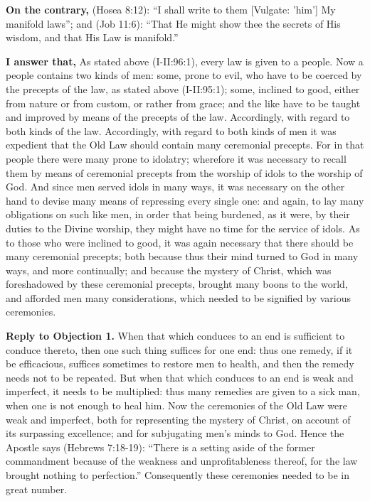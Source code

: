 \textbf{On the contrary,} (Hosea 8:12): ``I shall write to them [Vulgate: 'him'] My manifold laws''; and (Job 11:6): ``That He might show thee the secrets of His wisdom, and that His Law is manifold.''

\textbf{I answer that,} As stated above (I-II:96:1), every law is given to a people. Now a people contains two kinds of men: some, prone to evil, who have to be coerced by the precepts of the law, as stated above (I-II:95:1); some, inclined to good, either from nature or from custom, or rather from grace; and the like have to be taught and improved by means of the precepts of the law. Accordingly, with regard to both kinds of the law. Accordingly, with regard to both kinds of men it was expedient that the Old Law should contain many ceremonial precepts. For in that people there were many prone to idolatry; wherefore it was necessary to recall them by means of ceremonial precepts from the worship of idols to the worship of God. And since men served idols in many ways, it was necessary on the other hand to devise many means of repressing every single one: and again, to lay many obligations on such like men, in order that being burdened, as it were, by their duties to the Divine worship, they might have no time for the service of idols. As to those who were inclined to good, it was again necessary that there should be many ceremonial precepts; both because thus their mind turned to God in many ways, and more continually; and because the mystery of Christ, which was foreshadowed by these ceremonial precepts, brought many boons to the world, and afforded men many considerations, which needed to be signified by various ceremonies.

\textbf{Reply to Objection 1.} When that which conduces to an end is sufficient to conduce thereto, then one such thing suffices for one end: thus one remedy, if it be efficacious, suffices sometimes to restore men to health, and then the remedy needs not to be repeated. But when that which conduces to an end is weak and imperfect, it needs to be multiplied: thus many remedies are given to a sick man, when one is not enough to heal him. Now the ceremonies of the Old Law were weak and imperfect, both for representing the mystery of Christ, on account of its surpassing excellence; and for subjugating men's minds to God. Hence the Apostle says (Hebrews 7:18-19): ``There is a setting aside of the former commandment because of the weakness and unprofitableness thereof, for the law brought nothing to perfection.'' Consequently these ceremonies needed to be in great number.

